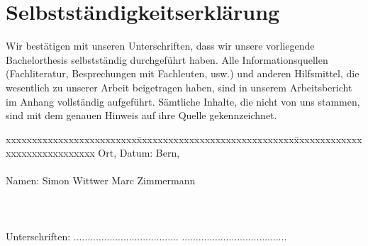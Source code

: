 \chapter*{Selbstständigkeitserklärung}
\label{chap:selbstaendigkeitserklaerung}

\vspace*{10mm}
Wir bestätigen mit unseren Unterschriften, dass wir unsere vorliegende Bachelorthesis selbstständig durchgeführt haben. Alle Informationsquellen (Fachliteratur, Besprechungen mit Fachleuten, usw.) und anderen Hilfsmittel, die wesentlich zu unserer Arbeit beigetragen haben, sind in unserem Arbeitsbericht im
Anhang vollständig aufgeführt. Sämtliche Inhalte, die nicht von uns stammen, sind mit dem genauen Hinweis auf ihre Quelle gekennzeichnet.

\vspace{15mm}

\begin{tabbing}
xxxxxxxxxxxxxxxxxxxxxxxxx\=xxxxxxxxxxxxxxxxxxxxxxxxxxxxxx\=xxxxxxxxxxxxxxxxxxxxxxxxxxxxxx\kill
Ort, Datum:		\> Bern, \versiondate \\ \\
Namen:	\> Simon Wittwer 	\> Marc Zimmermann \\ \\ \\ \\
Unterschriften:	\> ......................................\> ...................................... \\
\end{tabbing}
